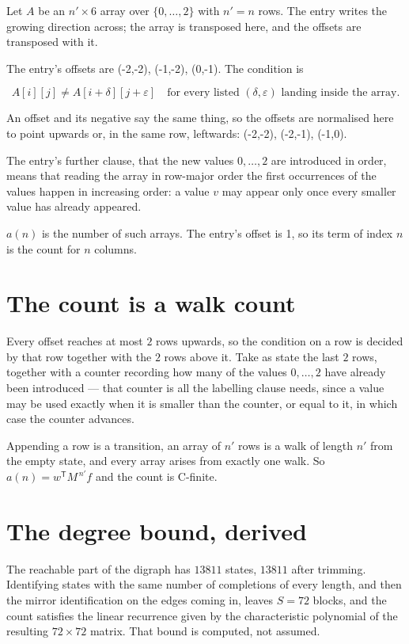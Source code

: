 \documentclass[11pt]{article}
\theoremstyle{definition}
\begin{document}
Let $A$ be an $n' \times 6$ array over $\{0,\dots,2\}$ with $n' = n$ rows. The entry writes the growing direction across; the array is transposed here, and the offsets are transposed with it.

The entry's offsets are (-2,-2), (-1,-2), (0,-1). The condition is

\[A[i][j] \ne A[i{+}\delta][j{+}\varepsilon]\quad\text{for every listed }(\delta,\varepsilon)\text{ landing inside the array.}\]

An offset and its negative say the same thing, so the offsets are normalised here to point upwards or, in the same row, leftwards: (-2,-2), (-2,-1), (-1,0).

The entry's further clause, that the new values $0,\dots,2$ are introduced in order, means that reading the array in row-major order the first occurrences of the values happen in increasing order: a value $v$ may appear only once every smaller value has already appeared.

$a(n)$ is the number of such arrays. The entry's offset is 1, so its term of index $n$ is the count for $n$ columns.

\section{The count is a walk count}

Every offset reaches at most $2$ rows upwards, so the condition on a row is decided by that row together with the $2$ rows above it. Take as state the last $2$ rows, together with a counter recording how many of the values $0,\dots,2$ have already been introduced --- that counter is all the labelling clause needs, since a value may be used exactly when it is smaller than the counter, or equal to it, in which case the counter advances.

Appending a row is a transition, an array of $n'$ rows is a walk of length $n'$ from the empty state, and every array arises from exactly one walk. So $a(n) = w^{\mathsf T}M^{\,n'}f$ and the count is C-finite.

\section{The degree bound, derived}

The reachable part of the digraph has $13811$ states, $13811$ after trimming. Identifying states with the same number of completions of every length, and then the mirror identification on the edges coming in, leaves $S = 72$ blocks, and the count satisfies the linear recurrence given by the characteristic polynomial of the resulting $72\times72$ matrix. That bound is computed, not assumed.
\end{document}
